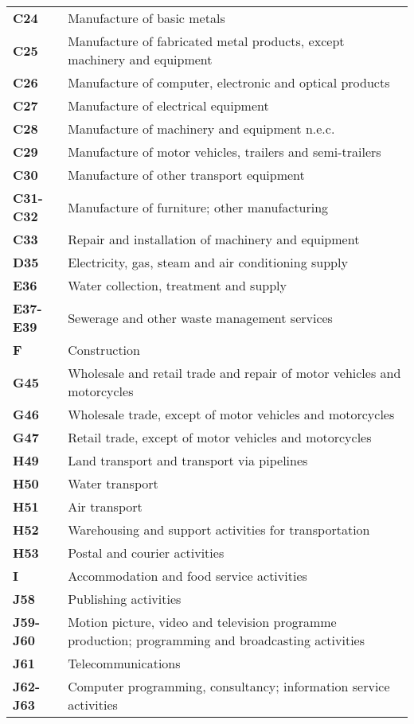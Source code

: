 \documentclass[11pt,a4paper]{article}
\begin{document}
\begin{appendices}
\begin{table}[!h]
\begin{tabular}{ll}
\textbf{C24} &{Manufacture of basic metals}\\
\textbf{C25} &{Manufacture of fabricated metal products, except machinery and equipment}\\
\textbf{C26} &{Manufacture of computer, electronic and optical products}\\
\textbf{C27} &{Manufacture of electrical equipment}\\
\textbf{C28} &{Manufacture of machinery and equipment n.e.c.}\\
\textbf{C29} &{Manufacture of motor vehicles, trailers and semi-trailers}\\
\textbf{C30} &{Manufacture of other transport equipment}\\
\textbf{C31-C32} &{Manufacture of furniture; other manufacturing}\\
\textbf{C33} &{Repair and installation of machinery and equipment}\\
\textbf{D35} &{Electricity, gas, steam and air conditioning supply}\\
\textbf{E36} &{Water collection, treatment and supply}\\
\textbf{E37-E39} &{Sewerage and other waste management services}\\
\textbf{F} &{Construction}\\
\textbf{G45} &{Wholesale and retail trade and repair of motor vehicles and motorcycles}\\
\textbf{G46} &{Wholesale trade, except of motor vehicles and motorcycles}\\
\textbf{G47} &{Retail trade, except of motor vehicles and motorcycles}\\
\textbf{H49} &{Land transport and transport via pipelines}\\
\textbf{H50} &{Water transport}\\
\textbf{H51} &{Air transport}\\
\textbf{H52} &{Warehousing and support activities for transportation}\\
\textbf{H53} &{Postal and courier activities}\\
\textbf{I} &{Accommodation and food service activities}\\
\textbf{J58} &{Publishing activities}\\
\textbf{J59-J60} &{Motion picture, video and television programme production; programming and broadcasting activities}\\
\textbf{J61} &{Telecommunications}\\
\textbf{J62-J63} &{Computer programming, consultancy; information service activities}\\

\end{tabular}
\end{table}
\end{appendices}
\end{document}

